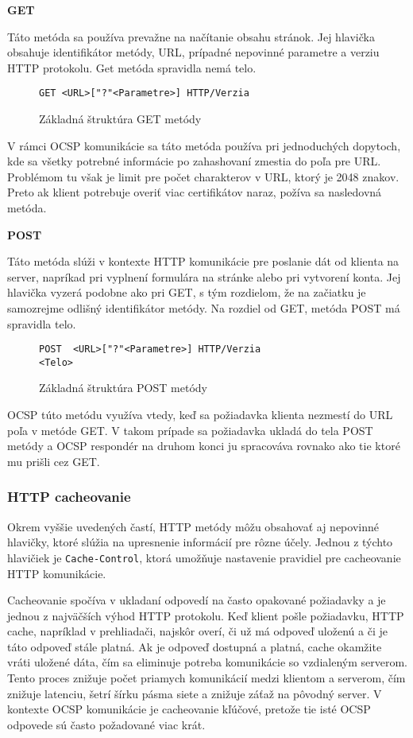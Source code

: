 \documentclass[12pt, twoside]{book}
\newcommand{\subsubsubsection}[1]{%
  \vspace{0.2em}  
  \textbf{#1} \\[0.2em]
  \hspace*{\parindent}
}
\begin{document}
\subsubsubsection{GET}
Táto metóda sa používa prevažne na načítanie obsahu stránok. Jej hlavička obsahuje identifikátor metódy, URL, prípadné nepovinné parametre a verziu HTTP protokolu. Get metóda spravidla nemá telo.

\begin{figure}[H]
\begin{lstlisting}
GET <URL>["?"<Parametre>] HTTP/Verzia
\end{lstlisting}
\caption{Základná štruktúra GET metódy}
\end{figure}

V rámci OCSP komunikácie sa táto metóda používa pri jednoduchých dopytoch, kde sa všetky potrebné informácie po zahashovaní zmestia do poľa pre URL. Problémom tu však je limit pre počet charakterov v URL, ktorý je 2048 znakov. Preto ak klient potrebuje overiť viac certifikátov naraz, požíva sa nasledovná metóda.

\subsubsubsection{POST}
Táto metóda slúži v kontexte HTTP komunikácie pre poslanie dát od klienta na server, napríkad pri vyplnení formulára na stránke alebo pri vytvorení konta. Jej hlavička vyzerá podobne ako pri GET, s tým rozdielom, že na začiatku je samozrejme odlišný identifikátor metódy. Na rozdiel od GET, metóda POST má spravidla telo.

\begin{figure}[H]
\begin{lstlisting}
POST  <URL>["?"<Parametre>] HTTP/Verzia
<Telo>
\end{lstlisting}
\caption{Základná štruktúra POST metódy}
\end{figure}

OCSP túto metódu využíva vtedy, keď sa požiadavka klienta nezmestí do URL poľa v metóde GET. V takom prípade sa požiadavka ukladá do tela POST metódy a OCSP  respondér na druhom konci ju spracováva rovnako ako tie ktoré mu prišli cez GET.

\subsubsection{HTTP cacheovanie}
Okrem vyššie uvedených častí, HTTP metódy môžu obsahovať aj nepovinné hlavičky, ktoré slúžia na upresnenie informácií pre rôzne účely. Jednou z týchto hlavičiek je \texttt{Cache-Control}, ktorá umožňuje nastavenie pravidiel pre cacheovanie HTTP komunikácie.

Cacheovanie spočíva v ukladaní odpovedí na často opakované požiadavky a je jednou z najväčších výhod HTTP protokolu. Keď klient pošle požiadavku, HTTP cache, napríklad v prehliadači, najskôr overí, či už má odpoveď uloženú a či je táto odpoveď stále platná. Ak je odpoveď dostupná a platná, cache okamžite vráti uložené dáta, čím sa eliminuje potreba komunikácie so vzdialeným serverom.
Tento proces znižuje počet priamych komunikácií medzi klientom a serverom, čím znižuje latenciu, šetrí šírku pásma siete a znižuje záťaž na pôvodný server. V kontexte OCSP komunikácie je cacheovanie kľúčové, pretože tie isté OCSP odpovede sú často požadované viac krát.
\end{document}
